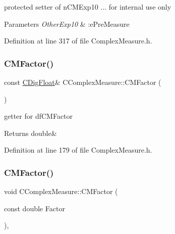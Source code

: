 protected setter of n\+C\+M\+Exp10 ... for internal use only 


\begin{DoxyParams}{Parameters}
{\em Other\+Exp10} & \+:e\+Pre\+Measure \\
\hline
\end{DoxyParams}


Definition at line 317 of file Complex\+Measure.\+h.

\mbox{\label{classCComplexMeasure_acdcab22efa233ea1c0e607bf22028afd}} 
\subsubsection{\texorpdfstring{C\+M\+Factor()}{CMFactor()}\hspace{0.1cm}{\footnotesize\ttfamily [1/2]}}
{\footnotesize\ttfamily const \hyperlink{classCDigFloat}{C\+Dig\+Float}\& C\+Complex\+Measure\+::\+C\+M\+Factor (\begin{DoxyParamCaption}{ }\end{DoxyParamCaption})\hspace{0.3cm}{\ttfamily [inline]}}



getter for df\+C\+M\+Factor 

\begin{DoxyReturn}{Returns}
double\& 
\end{DoxyReturn}


Definition at line 179 of file Complex\+Measure.\+h.

\mbox{\label{classCComplexMeasure_abc97b2ed29224bb00a912a94933192a2}} 
\subsubsection{\texorpdfstring{C\+M\+Factor()}{CMFactor()}\hspace{0.1cm}{\footnotesize\ttfamily [2/2]}}
{\footnotesize\ttfamily void C\+Complex\+Measure\+::\+C\+M\+Factor (\begin{DoxyParamCaption}\item[{const double}]{Factor }\end{DoxyParamCaption})\hspace{0.3cm}{\ttfamily [inline]}, {\ttfamily [protected]}}



